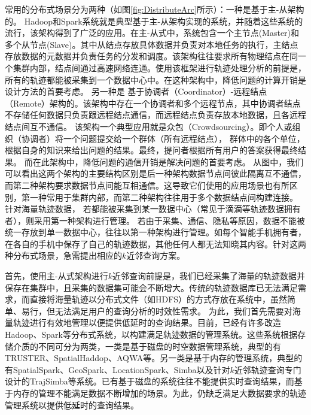         常用的分布式场景分为两种（如图\ref{fig:DistributeArc}所示）：一种是基于主-从架构的。
        Hadoop和Spark系统就是典型基于主-从架构实现的系统，并随着这些系统的流行，该架构得到了广泛的应用。在主-从式中，系统包含一个主节点(Master)和多个从节点(Slave)。其中从结点存放具体数据并负责对本地任务的执行，主结点存放数据的元数据并负责任务的分发和调度。该架构往往要求所有物理结点在同一个集群内部，结点间通过高速网络连通。使用该框架进行轨迹处理分析的前提是，所有的轨迹都能被采集到一个数据中心中。在这种架构中，降低问题的计算开销是设计方法的首要考虑。
 另一种是  基于协调者（Coordinator）-远程结点（Remote）架构的。该架构中存在一个协调者和多个远程节点，其中协调者结点不存储任何数据只负责跟远程结点通信，而远程结点负责存放本地数据，且各远程结点间互不通信。 
 该架构一个典型应用就是众包（Crowdsourcing）。即个人或组织（协调者）将一个问题提交给一个群体（所有远程结点），
 群体中的各个单位，根据自身的知识来给出问题的结果。最终，提问者根据所有用户的答案获得最终结果。
 而在此架构中，降低问题的通信开销是解决问题的首要考虑。
        从图中，我们可以看出这两个架构的主要结构区别是后一种架构数据节点间彼此隔离互不通信，而第二种架构要求数据节点间能互相通信。这导致它们使用的应用场景也有所区别，第一种常用于集群内部，而第二种架构往往用于多个数据结点间构建连接。
        针对海量轨迹数据，   若都能被采集到某一数据中心（常见于滴滴等轨迹数据拥有者），则采用第一种架构进行管理。
        若由于采集、通信、隐私等原因，数据不能被统一存放到单一数据中心，往往以第一种架构进行管理。如每个智能手机拥有者，在各自的手机中保存了自己的轨迹数据，其他任何人都无法知晓其内容。针对这两种分布式场景，急需提出相应的$k$近邻查询方案。
        
        
        首先，使用主-从式架构进行$k$近邻查询前提是，我们已经采集了海量的轨迹数据并保存在集群中，且采集的数据集可能会不断增大。传统的轨迹数据库已无法满足需求\cite{BoteaMNS08,ChakkaEP03,Cudre-MaurouxWM10}，而直接将海量轨迹以分布式文件（如HDFS）的方式存放在系统中，虽然简单、易行，但无法满足用户的查询分析的时效性需求。
        为此，我们首先需要对海量轨迹进行有效地管理以便提供低延时的查询结果。目前，已经有许多改造Hadoop、Spark等分布式系统，以构建满足轨迹数据的管理系统。这些系统根据存储介质的不同可分为两类，一类是基于磁盘的时空数据管理系统，典型的有TRUSTER\cite{MaYQZ09,YangMQZ09}、SpatialHaddop\cite{SpatialHadoop}、AQWA\cite{AlyMHAOEQ15}等。另一类是基于内存的管理系统，典型的有SpatialSpark\cite{SpatialSpark}、GeoSpark\cite{GeoSpark}、LocationSpark\cite{Locationspark}、Simba\cite{Simba}以及针对$k$近邻轨迹查询专门设计的TrajSimba\cite{trajectoryVLDB}等系统。已有基于磁盘的系统往往不能提供实时查询结果，而基于内存的管理不能满足数据不断增加的场景。为此，仍缺乏满足大数据要求的轨迹管理系统以提供低延时的查询结果。
        
